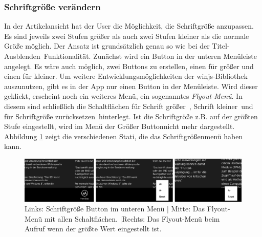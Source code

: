\documentclass[12pt,a4paper,bibtotoc,abstracton]{scrartcl}
\begin{document}
\subsubsection{Schriftgröße verändern}
\label{subsubsec:schriftgroesseveraendern}
In der Artikelansicht hat der User die Möglichkeit, die Schriftgröße anzupassen. Es sind jeweils zwei Stufen größer als auch zwei Stufen kleiner als die normale Größe möglich. Der  Ansatz ist grundsätzlich genau so wie bei der \glqq Titel-Ausblenden\grqq\ Funktionalität. Zunächst wird ein Button in der unteren Menüleiste angelegt. Es wäre auch möglich, zwei Buttons zu erstellen, einen für größer und einen für kleiner. Um weitere  Entwicklungsmöglichkeiten der \ac{winjs}-Bibliothek auszunutzen, gibt es in der App nur einen Button in der Menüleiste. Wird dieser geklickt, erscheint noch ein weiteres Menü, ein sogenanntes \textit{Flyout-Menü}. In diesem sind schließlich die Schaltflächen für \glqq Schrift größer\grqq\ , \glqq Schrift kleiner\grqq\ und für \glqq Schriftgröße zurücksetzen\grqq\ hinterlegt. Ist die Schriftgröße z.B. auf der größten Stufe eingestellt, wird im Menü der \glqq Größer Button\grqq nicht mehr dargestellt. Abbildung \ref{fig:fontsizemenü} zeigt die verschiedenen Stati, die das Schriftgrößenmenü haben kann.

\begin{figure}[h]
	\centering
	\includegraphics[width=\textwidth]{Bilder/Screenshots/app/font_size_menu_kompakt.png} 
	\caption[Die Schriftgröße-Buttons]{Links: Schriftgröße Button im unteren Menü | Mitte: Das Flyout-Menü mit allen Schaltflächen. |Rechts: Das Flyout-Menü beim Aufruf wenn der größte Wert eingestellt ist.}
	\label{fig:fontsizemenü}
\end{figure} 
\end{document}
